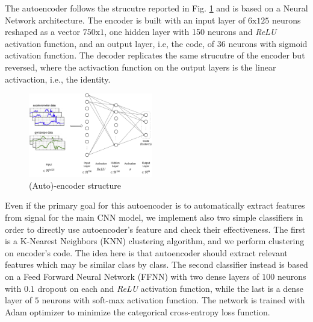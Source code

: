 The autoencoder follows the strucutre reported in
Fig. \ref{fig:encoder-structure} and is based on a Neural Network
architecture. The encoder is built with an input layer of
$6\text{x}125$ neurons reshaped as a vector $750\text{x}1$, one hidden
layer with 150 neurons and \textit{ReLU} activation function, and an output
layer, i.e, the code, of $36$ neurons with sigmoid activation
function. The decoder replicates the same strucutre of the encoder but
reversed, where the activaction function on the output layers is the
linear activaction, i.e., the identity.
\begin{figure}[H]
  \centering
  \includegraphics[width=0.48\textwidth]{images/encoder.png}
  \caption{(Auto)-encoder structure}
  \label{fig:encoder-structure}
\end{figure}

Even if the primary goal for this autoencoder is to automatically
extract features from signal for the main CNN model, we implement also
two simple classifiers in order to directly use autoencoder's feature
and check their effectiveness.  The first is a K-Nearest Neighbors
(KNN) clustering algorithm, and we perform clustering on encoder's
code. The idea here is that autoencoder should extract relevant
features which may be similar class by class.  The second classifier
instead is based on a Feed Forward Neural Network (FFNN) with two
dense layers of $100$ neurons with $0.1$ dropout on each and \textit{ReLU}
activation function, while the last is a dense layer of $5$ neurons
with soft-max activation function. The network is trained with Adam
optimizer to minimize the categorical cross-entropy loss function.


